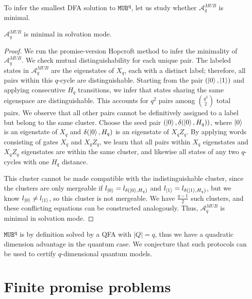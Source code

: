 \documentclass[../main.tex]{subfiles}
\begin{document}
To infer the smallest \ac{DFA} solution to $\mathtt{MUB^q}$, let us study whether $\mathcal{A}^{MUB}_{q}$ is minimal.

\begin{theorem}
    $\mathcal{A}^{MUB}_{q}$ is minimal in solvation mode.
\end{theorem}

\begin{proof}
    We run the promise-version Hopcroft method to infer the minimality of $\mathcal{A}^{MUB}_{q}$. We check mutual distinguishability for each unique pair. The labeled states in $\mathcal{A}^{MUB}_{q}$ are the eigenstates of $X_q$, each with a distinct label; therefore, all pairs within this $q$-cycle are distinguishable. Starting from the pair $(\ket{0},\ket{1})$ and applying consecutive $H_q$ transitions, we infer that states sharing the same eigenspace are distinguishable. This accounts for $q^2$ pairs among $\binom{q^2}{2}$ total pairs.
    We observe that all other pairs cannot be definitively assigned to a label but belong to the same cluster. Choose the seed pair $(\ket{0}, \delta(\ket{0},H_q))$, where $\ket{0}$ is an eigenstate of $X_q$ and $\delta(\ket{0},H_q)$ is an eigenstate of $X_q Z_q$. By applying words consisting of gates $X_q$ and $X_q Z_q$, we learn that all pairs within $X_q$ eigenstates and $X_q Z_q$ eigenstates are within the same cluster, and likewise all states of any two $q$-cycles with one $H_q$ distance. 
    
    This cluster cannot be made compatible with the indistinguishable cluster, since the clusters are only mergeable if $l_{\ket{0}}= l_{\delta(\ket{0},H_q)}$ and $l_{\ket{1}}= l_{\delta(\ket{1},H_q)}$, but we know $l_{\ket{0}} \neq l_{\ket{1}}$, so this cluster is not mergeable. We have $\frac{q-1}{2}$ such clusters, and these conflicting equations can be constructed analogously. Thus, $\mathcal{A}^{MUB}_{q}$ is minimal in solvation mode.
\end{proof}
$\mathtt{MUB^q}$ is by definition solved by a \ac{QFA} with $|Q| = q$, thus we have a quadratic dimension advantage in the quantum case. We conjecture that such protocols can be used to certify $q$-dimensional quantum models.

\section{Finite promise problems}
\end{document}
